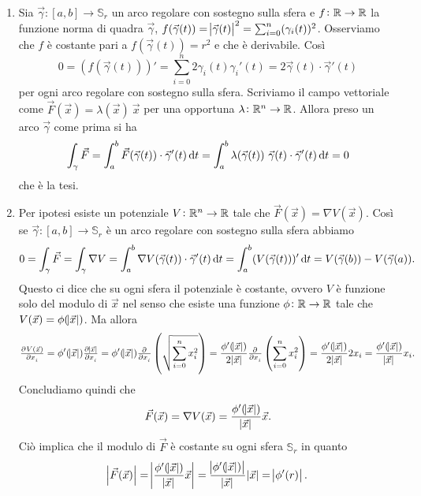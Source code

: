 \begin{enumerate}[label = (\roman*)]
\item Sia $ \vec{\gamma} \colon [a, b] \to \mathbb{S}_r $ un arco regolare con sostegno sulla sfera e $ f \colon \mathbb{R} \to \mathbb{R} $ la funzione norma di quadra $ \vec{\gamma} $,  $ f(\vec{\gamma}(t)) = \abs{\vec{\gamma}(t)}^2 = \sum_{i = 0}^{n} (\gamma_i(t))^2 $. Osserviamo che $ f $ è costante pari a $ f(\vec{\gamma}(t)) = r^2 $ e che è derivabile. Così
  \begin{equation*}
    0 = (f(\vec{\gamma}(t)))' = \sum_{i = 0}^{n} 2 \gamma_i(t) \gamma_i'(t) = 2 \vec{\gamma}(t) \cdot \vec{\gamma}'(t)
  \end{equation*}
  per ogni arco regolare con sostegno sulla sfera. Scriviamo il campo vettoriale come $ \vec{F}(\vec{x}) = \lambda(\vec{x}) \ \vec{x} $ per una opportuna $ \lambda \colon \mathbb{R}^n \to \mathbb{R} $. Allora preso un arco $ \vec{\gamma} $ come prima si ha \[\int_{\gamma} \vec{F} = \int_{a}^{b} \vec{F}(\vec{\gamma}(t)) \cdot \vec{\gamma}'(t) \dif{t} = \int_{a}^{b} \lambda(\vec{\gamma}(t)) \  \vec{\gamma}(t) \cdot \vec{\gamma}'(t) \dif{t} = 0\] che è la tesi.
\item Per ipotesi esiste un potenziale $ V \colon \mathbb{R}^n \to \mathbb{R} $ tale che $ \vec{F}(\vec{x}) = \nabla{V(\vec{x})} $. Così se $ \vec{\gamma} \colon [a, b] \to \mathbb{S}_r $ è un arco regolare con sostegno sulla sfera abbiamo
  \begin{equation*}
    0 = \int_{\gamma} \vec{F} = \int_{\gamma} \nabla{V} = \int_{a}^{b} \nabla{V}(\vec{\gamma}(t)) \cdot \vec{\gamma}'(t) \dif{t} = \int_{a}^{b} (V(\vec{\gamma}(t)))' \dif{t} = V(\vec{\gamma}(b)) - V(\vec{\gamma}(a)).
  \end{equation*}
  Questo ci dice che su ogni sfera il potenziale è costante, ovvero $ V $ è funzione solo del modulo di $ \vec{x} $ nel senso che esiste una funzione $ \phi \colon \mathbb{R} \to \mathbb{R} $ tale che $ V(\vec{x}) = \phi(\abs{\vec{x}}) $. Ma allora \[\pd[]{V(\vec{x})}{x_i} = \phi'(\abs{\vec{x}}) \pd[]{\abs{\vec{x}}}{x_i} = \phi'(\abs{\vec{x}}) \pd[]{}{x_i} \left(\sqrt{\sum_{i = 0}^{n} x_i^2}\right) = \frac{\phi'(\abs{\vec{x}})}{2 \abs{\vec{x}}} \pd[]{}{x_i} \left(\sum_{i = 0}^{n} x_i^2\right) = \frac{\phi'(\abs{\vec{x}})}{2 \abs{\vec{x}}} 2 x_i = \frac{\phi'(\abs{\vec{x}})}{\abs{\vec{x}}} x_i.\] Concludiamo quindi che \[\vec{F}(\vec{x}) = \nabla{V}(\vec{x}) = \frac{\phi'(\abs{\vec{x}})}{\abs{\vec{x}}} \vec{x}.\] Ciò implica che il modulo di $ \vec{F} $ è costante su ogni sfera $ \mathbb{S}_r $ in quanto \[\abs{\vec{F}(\vec{x})} = \abs{\frac{\phi'(\abs{\vec{x}})}{\abs{\vec{x}}} \vec{x}} = \frac{\abs{\phi'(\abs{\vec{x}})}}{\abs{\vec{x}}} \abs{\vec{x}} = \abs{\phi'(r)}.\]
\end{enumerate}